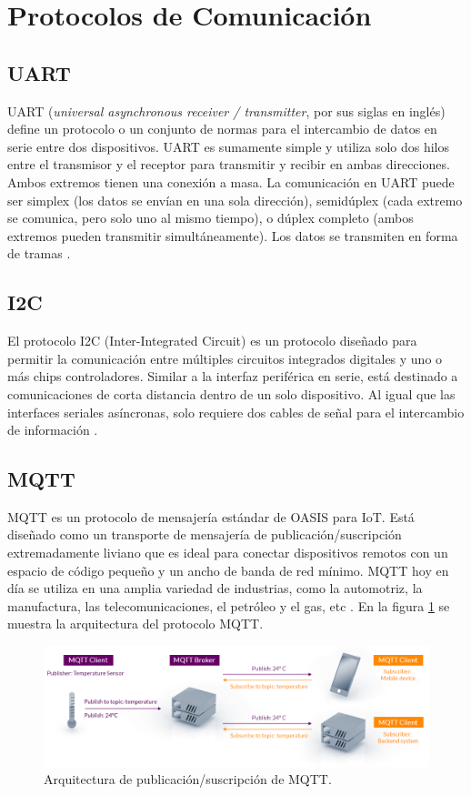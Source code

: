 \section{Protocolos de Comunicación}
\subsection{UART}
UART (\textit{universal asynchronous receiver / transmitter}, por sus siglas en inglés) define un protocolo o un conjunto de normas para el intercambio de datos en serie entre dos dispositivos. UART es sumamente simple y utiliza solo dos hilos entre el transmisor y el receptor para transmitir y recibir en ambas direcciones. Ambos extremos tienen una conexión a masa. La comunicación en UART puede ser simplex (los datos se envían en una sola dirección), semidúplex (cada extremo se comunica, pero solo uno al mismo tiempo), o dúplex completo (ambos extremos pueden transmitir simultáneamente). Los datos se transmiten en forma de tramas \citep{UART}.
\subsection{I2C}

El protocolo I2C (Inter-Integrated Circuit) es un protocolo diseñado para permitir la comunicación entre múltiples circuitos integrados digitales y uno o más chips controladores. Similar a la interfaz periférica en serie, está destinado a comunicaciones de corta distancia dentro de un solo dispositivo. Al igual que las interfaces seriales asíncronas, solo requiere dos cables de señal para el intercambio de información \citep{I2C}.

\subsection{MQTT}
MQTT es un protocolo de mensajería estándar de OASIS para IoT. Está diseñado como un transporte de mensajería de publicación/suscripción extremadamente liviano que es ideal para conectar dispositivos remotos con un espacio de código pequeño y un ancho de banda de red mínimo. MQTT hoy en día se utiliza en una amplia variedad de industrias, como la automotriz, la manufactura, las telecomunicaciones, el petróleo y el gas, etc \citep{MQTT}. En la figura \ref{fig:ArquitecturaMQTT} se muestra la arquitectura del protocolo MQTT.

\begin{figure}[htbp]
	\centering
	\includegraphics[width=1\textwidth]{./Figures/mqtt-publish-subscribe.png}
	\caption{Arquitectura de publicación/suscripción de MQTT.}
	\label{fig:ArquitecturaMQTT}
\end{figure}
